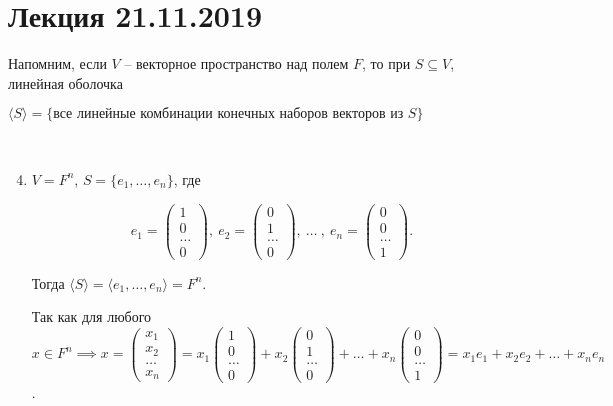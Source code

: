 \section{Лекция 21.11.2019}

Напомним, если $V$ -- векторное пространство над полем $F$, то при $S \subseteq V$, линейная оболочка 

$\langle S \rangle = \{\text{все линейные комбинации конечных наборов векторов из } S\}$

\begin{example}~
    \begin{enumerate}
    \setcounter{enumi}{3}
    \item
        $V = F^n$, $S = \{e_1, \dots, e_n\}$, где

        \begin{equation*}
            e_1 = \begin{pmatrix} 1 \\ 0 \\ \dots \\ 0 \end{pmatrix}, \
            e_2 = \begin{pmatrix} 0 \\ 1 \\ \dots \\ 0 \end{pmatrix}, \
            \dots \ , \
            e_n = \begin{pmatrix} 0 \\ 0 \\ \dots \\ 1 \end{pmatrix}
        .\end{equation*}

        Тогда $\langle S \rangle = \langle e_1, \dots, e_n \rangle = F^n$.

        Так как для любого $x \in F^n \implies x = \begin{pmatrix} x_1 \\ x_2 \\ \dots \\ x_n \end{pmatrix} = x_1 \begin{pmatrix} 1 \\ 0 \\ \dots \\ 0 \end{pmatrix} + x_2 \begin{pmatrix} 0 \\ 1 \\ \dots \\ 0 \end{pmatrix} + \dots + x_n \begin{pmatrix} 0 \\ 0 \\ \dots \\ 1 \end{pmatrix} = x_1 e_1 + x_2 e_2 + \dots + x_n e_n$.
    \end{enumerate}
\end{example}


